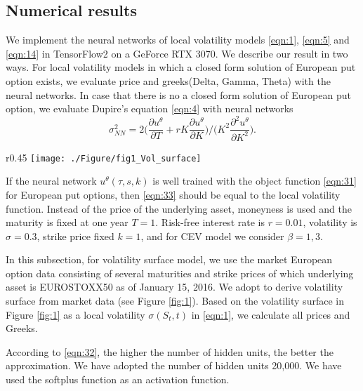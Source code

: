 \documentclass[11pt,reqno]{article}
\numberwithin{equation}{section}
\begin{document}
{\subsection{Numerical results}\label{sec:Mu_nu1}
We implement the neural networks of local volatility models \eqref{eqn:1}, \eqref{eqn:5} and \eqref{eqn:14} in TensorFlow2 on a GeForce RTX 3070. We describe our result in two ways. For local volatility models in which a closed form solution of European put option exists, we evaluate price and greeks(Delta, Gamma, Theta) with the neural networks. In case that there is no a closed form solution of European put option, we evaluate Dupire's equation \eqref{eqn:4} with neural networks 
\begin{equation}\label{eqn:33}
    \sigma^2_{NN} = 
    2 \big( \frac{\partial u^\theta}{\partial T} + rK\frac{\partial u^\theta}{\partial K}\big) /
    \big(K^2 \frac{\partial^2 u^\theta}{\partial K^2}\big).
\end{equation}

\begin{wrapfigure}{r}{0.45\textwidth}
    \centering
	\texttt{[image: ./Figure/fig1\_Vol\_surface]}
	\caption{Local volatility surface obtained from EUROSTOXX50 option data of January 15, 2016.}  
   	\label{fig:1}
\end{wrapfigure} 

If the neural network $u^\theta (\tau,s,k)$ is well trained with the object function \eqref{eqn:31} for European put options, 
then \eqref{eqn:33} should be equal to the local volatility function.
Instead of the price of the underlying asset, moneyness is used and the maturity is fixed at one year $T=1$.
Risk-free interest rate is $r=0.01$, volatility is $\sigma=0.3$,
strike price fixed $k=1$, and for CEV model we consider $\beta=1,3$. 

In this subsection, for volatility surface model, we use the market European option data consisting of several maturities and strike prices of which underlying asset is EUROSTOXX50 as of January 15, 2016. We adopt \cite{ART002181552} to derive volatility surface from market data (see Figure \ref{fig:1}). 
Based on the volatility surface in Figure \ref{fig:1}
 as a local volatility $\sigma(S_t,t)$ in \eqref{eqn:1}, we calculate all prices and Greeks.

According to \eqref{eqn:32}, the higher the number of hidden units, the better the approximation.
We have adopted the number of hidden units 20,000.
 We have used the softplus function as an activation function.

}
\end{document}
